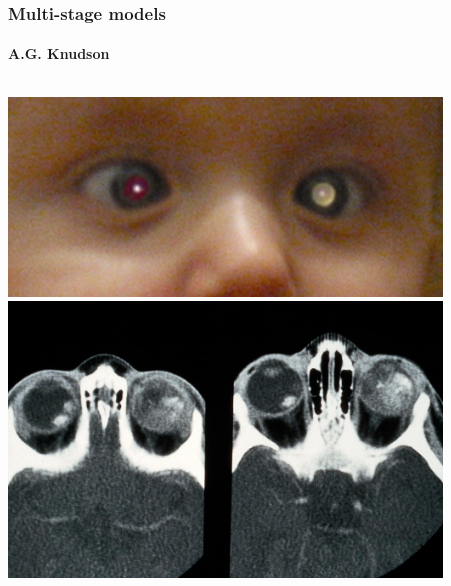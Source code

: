 \documentclass{beamer}
\begin{document}
\begin{frame}
    \frametitle{Multi-stage models}
    \framesubtitle{A.G. Knudson\footnotemark[12]}

    \begin{columns}
        \begin{column}{0.5\textwidth}
            \includegraphics[width=0.90\textwidth]{figures/Rb_whiteeye.PNG}
            \;
            \includegraphics[width=0.90\textwidth]{figures/retinoblastoma.jpg}
        \end{column}
        \begin{column}{0.5\textwidth}

\end{column}
\end{columns}
\end{frame}
\end{document}
